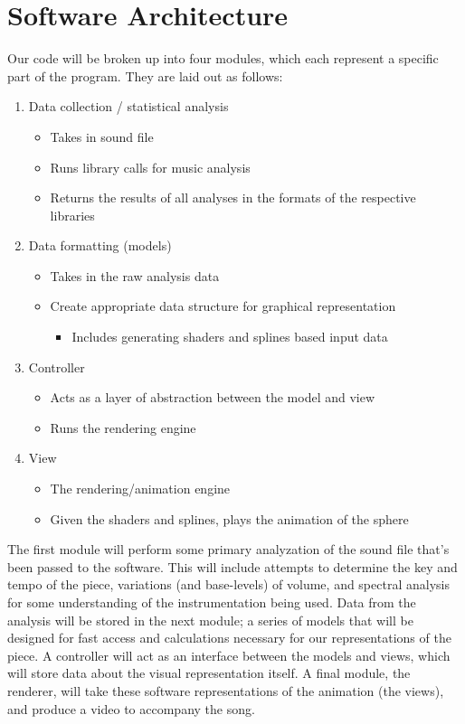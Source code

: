 \documentclass{article}
\begin{document}
\section{Software Architecture}

Our code will be broken up into four modules, which each represent a specific part of the program. They are laid out as follows: \\

\begin{enumerate}
	\item Data collection / statistical analysis
	\begin{itemize}
		\item Takes in sound file
		\item Runs library calls for music analysis
		\item Returns the results of all analyses in the formats of the respective libraries
	\end{itemize}
	\item Data formatting (models)
	\begin{itemize}
		\item Takes in the raw analysis data
		\item Create appropriate data structure for graphical representation
		\begin{itemize}
			\item Includes generating shaders and splines based input data 
		\end{itemize}
	\end{itemize}
	\item Controller
	\begin{itemize}
		\item Acts as a layer of abstraction between the model and view
		\item Runs the rendering engine
	\end{itemize}
	\item View
	\begin{itemize}
		\item The rendering/animation engine
		\item Given the shaders and splines, plays the animation of the sphere
	\end{itemize}
\end{enumerate}

The first module will perform some primary analyzation of the sound file that's been passed to the software. This will include attempts to determine the key and tempo of the piece, variations (and base-levels) of volume, and spectral analysis for some understanding of the instrumentation being used. Data from the analysis will be stored in the next module; a series of models that will be designed for fast access and calculations necessary for our representations of the piece.
	A controller will act as an interface between the models and views, which will store data about the visual representation itself. A final module, the renderer, will take these software representations of the animation (the views), and produce a video to accompany the song.
\end{document}
